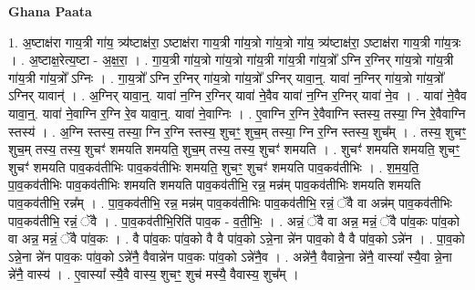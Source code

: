 \documentclass[17pt]{extarticle}
\begin{document}
\textbf{Ghana Paata } \newline

1. अ॒ष्टाक्ष॑रा गाय॒त्री गा॑य॒ त्र्य॑ष्टाक्ष॑रा॒ ऽष्टाक्ष॑रा गाय॒त्री गा॑य॒त्रो गा॑य॒त्रो गा॑य॒
त्र्य॑ष्टाक्ष॑रा॒ ऽष्टाक्ष॑रा गाय॒त्री गा॑य॒त्रः । . अ॒ष्टाक्ष॒रेत्य॒ष्टा - अ॒क्ष॒रा॒ । . गा॒य॒त्री गा॑य॒त्रो गा॑य॒त्रो गा॑य॒त्री गा॑य॒त्री गा॑य॒त्रो᳚ ऽग्नि र॒ग्निर् गा॑य॒त्रो गा॑य॒त्री गा॑य॒त्री गा॑य॒त्रो᳚ ऽग्निः । . गा॒य॒त्रो᳚ ऽग्नि र॒ग्निर् गा॑य॒त्रो गा॑य॒त्रो᳚ ऽग्निर् यावा॒न्॒. यावा॑ न॒ग्निर् गा॑य॒त्रो गा॑य॒त्रो᳚ ऽग्निर् यावान्॑ । . अ॒ग्निर् यावा॒न्॒. यावा॑ न॒ग्नि र॒ग्निर् यावा॑ ने॒वैव यावा॑ न॒ग्नि र॒ग्निर् यावा॑ ने॒व । . यावा॑ ने॒वैव यावा॒न्॒. यावा॑ ने॒वाग्नि र॒ग्नि रे॒व यावा॒न्॒. यावा॑ ने॒वाग्निः । . ए॒वाग्नि र॒ग्नि रे॒वैवाग्नि स्तस्य॒ तस्या॒ ग्नि रे॒वैवाग्नि स्तस्य॑ । . अ॒ग्नि स्तस्य॒ तस्या॒ ग्नि र॒ग्नि स्तस्य॒ शुचꣳ॒॒ शुच॒म् तस्या॒ ग्नि र॒ग्नि स्तस्य॒ शुच᳚म् । . तस्य॒ शुचꣳ॒॒ शुच॒म् तस्य॒ तस्य॒ शुचꣳ॑ शमयति शमयति॒ शुच॒म् तस्य॒ तस्य॒ शुचꣳ॑ शमयति । . शुचꣳ॑ शमयति शमयति॒ शुचꣳ॒॒ शुचꣳ॑ शमयति पाव॒कव॑तीभिः पाव॒कव॑तीभिः शमयति॒ शुचꣳ॒॒ शुचꣳ॑ शमयति पाव॒कव॑तीभिः । . श॒म॒य॒ति॒ पा॒व॒कव॑तीभिः पाव॒कव॑तीभिः शमयति शमयति पाव॒कव॑तीभि॒ रन्न॒ मन्न॑म् पाव॒कव॑तीभिः शमयति शमयति पाव॒कव॑तीभि॒ रन्न᳚म् । . पा॒व॒कव॑तीभि॒ रन्न॒ मन्न॑म् पाव॒कव॑तीभिः पाव॒कव॑तीभि॒ रन्नं॒ ॅवै वा अन्न॑म् पाव॒कव॑तीभिः पाव॒कव॑तीभि॒ रन्नं॒ ॅवै । . पा॒व॒कव॑तीभि॒रिति॑ पाव॒क - व॒ती॒भिः॒ । . अन्नं॒ ॅवै वा अन्न॒ मन्नं॒ ॅवै पा॑व॒कः पा॑व॒को वा अन्न॒ मन्नं॒ ॅवै पा॑व॒कः । . वै पा॑व॒कः पा॑व॒को वै वै पा॑व॒को ऽन्ने॒ना न्ने॑न पाव॒को वै वै पा॑व॒को ऽन्ने॑न । . पा॒व॒को ऽन्ने॒ना न्ने॑न पाव॒कः पा॑व॒को ऽन्ने॑नै॒ वैवान्ने॑न पाव॒कः पा॑व॒को ऽन्ने॑नै॒व । . अन्ने॑नै॒ वैवान्ने॒ना न्ने॑नै॒ वास्या᳚ स्यै॒वा न्ने॒ना न्ने॑नै॒ वास्य॑ । . ए॒वास्या᳚ स्यै॒वै वास्य॒ शुचꣳ॒॒ शुच॑ मस्यै॒ वैवास्य॒ शुच᳚म् । \newline
\end{document}
